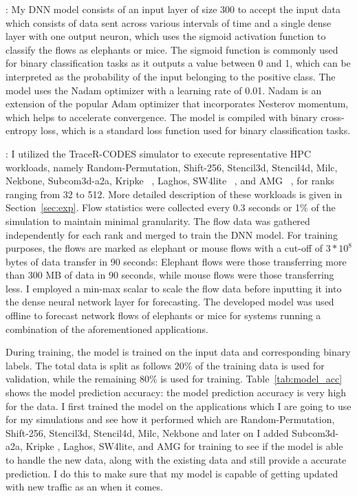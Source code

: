 \vspace{0.08in}
:
My DNN model consists of an input layer of size 300 to accept the input data
which consists of data sent across various intervals of time and a single dense layer with
one output neuron, which uses the sigmoid activation function to classify the flows as elephants or mice.
The sigmoid function is commonly used for binary classification tasks
as it outputs a value between 0 and 1, which can be 
interpreted as the probability of the input belonging to the positive class. 
The model uses the Nadam optimizer with a learning rate of 0.01. Nadam is an 
extension of the popular Adam optimizer that incorporates Nesterov momentum, 
which helps to accelerate convergence. The model is compiled with binary 
cross-entropy loss, which is a standard loss function used for binary 
classification tasks.

\vspace{0.08in}
:
I utilized the TraceR-CODES simulator to execute representative HPC 
workloads, namely Random-Permutation, Shift-256, Stencil3d, Stencil4d, Milc, Nekbone, Subcom3d-a2a, Kripke ~\cite{kripke}, Laghos, 
SW4lite ~\cite{sjogreen2018sw4}, and AMG ~\cite{amg}, 
for ranks ranging from 32 to 512. More detailed description of these
workloads is given in Section~\ref{sec:exp}.
Flow statistics were collected every 0.3 
seconds or 1\%
of the simulation to maintain minimal granularity. The flow data 
was gathered independently for each rank and merged to train the DNN 
model. For training purposes, the flows are marked as elephant or
mouse flows with a cut-off of $3 * 10^8$ bytes of data transfer in 90 seconds: 
Elephant flows were those transferring more than 300 MB of data in
90 seconds, while mouse flows were 
those transferring less. I employed a min-max scalar to scale the flow data 
before inputting it into the dense neural network layer for forecasting. The 
developed model was used offline to forecast network flows of elephants
or mice for systems running a combination of the aforementioned
applications.

During training, the model is trained on the input data and
corresponding binary labels. The total data is split as follows 20\%
of the training data is used for validation, while the remaining 80\% is 
used for training. Table~\ref{tab:model_acc} shows the model prediction
accuracy: the model prediction accuracy is very high for the data. 
I first trained the model on the applications which I are going to use for my simulations and 
see how it performed which are Random-Permutation, Shift-256, Stencil3d, Stencil4d, Milc, Nekbone and later on I added Subcom3d-a2a, Kripke , Laghos, SW4lite, and AMG for training to see if the model is able to handle the new data, along with the existing data and still provide a accurate prediction. I do this to make sure that my model is capable of getting  updated with new traffic as an when it comes. 

